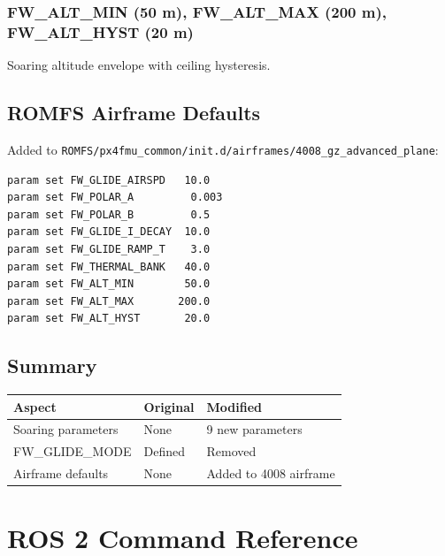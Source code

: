 \documentclass[12pt,a4paper]{report}
\begin{document}
\subsection{FW\_ALT\_MIN (50 m), FW\_ALT\_MAX (200 m), FW\_ALT\_HYST (20 m)}

Soaring altitude envelope with ceiling hysteresis.

\section{ROMFS Airframe Defaults}

Added to \texttt{ROMFS/px4fmu\_common/init.d/airframes/4008\_gz\_advanced\_plane}:

\begin{lstlisting}[language=bash]
param set FW_GLIDE_AIRSPD   10.0
param set FW_POLAR_A         0.003
param set FW_POLAR_B         0.5
param set FW_GLIDE_I_DECAY  10.0
param set FW_GLIDE_RAMP_T    3.0
param set FW_THERMAL_BANK   40.0
param set FW_ALT_MIN        50.0
param set FW_ALT_MAX       200.0
param set FW_ALT_HYST       20.0
\end{lstlisting}

\section{Summary}

\begin{center}
\begin{tabular}{p{4.5cm}p{4cm}p{4.5cm}}
\toprule
Aspect & Original & Modified \\
\midrule
Soaring parameters & None & 9 new parameters \\
FW\_GLIDE\_MODE & Defined & Removed \\
Airframe defaults & None & Added to 4008 airframe \\
\bottomrule
\end{tabular}
\end{center}

\appendix
\chapter{ROS 2 Command Reference}
\end{document}
